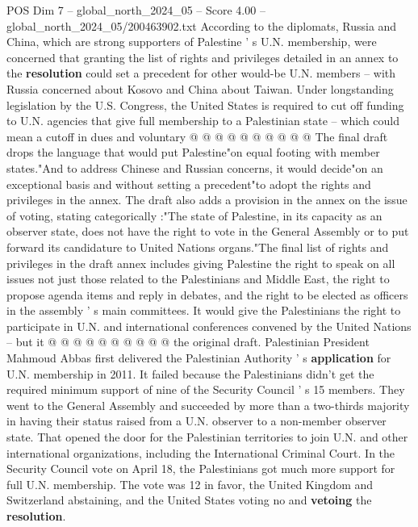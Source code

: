 \begin{textsample}{POS Dim 7 – global\_north\_2024\_05 – Score 4.00 – global\_north\_2024\_05/200463902.txt}
According to the diplomats, Russia and China, which are strong supporters of Palestine ' s U.N. membership, were concerned that granting the list of rights and privileges detailed in an annex to the \textbf{resolution} could set a precedent for other would-be U.N. members -- with Russia concerned about Kosovo and China about Taiwan.
Under longstanding legislation by the U.S.
Congress, the United States is required to cut off funding to U.N. agencies that give full membership to a Palestinian state -- which could mean a cutoff in dues and voluntary @ @ @ @ @ @ @ @ @ @ The final draft drops the language that would put Palestine"on equal footing with member states."And to address Chinese and Russian concerns, it would decide"on an exceptional basis and without setting a precedent"to adopt the rights and privileges in the annex.
The draft also adds a provision in the annex on the issue of voting, stating categorically :"The state of Palestine, in its capacity as an observer state, does not have the right to vote in the General Assembly or to put forward its candidature to United Nations organs."The final list of rights and privileges in the draft annex includes giving Palestine the right to speak on all issues not just those related to the Palestinians and Middle East, the right to propose agenda items and reply in debates, and the right to be elected as officers in the assembly ' s main committees.
It would give the Palestinians the right to participate in U.N. and international conferences convened by the United Nations -- but it @ @ @ @ @ @ @ @ @ @ the original draft.
Palestinian President Mahmoud Abbas first delivered the Palestinian Authority ' s \textbf{application} for U.N. membership in 2011.
It failed because the Palestinians didn't get the required minimum support of nine of the Security Council ' s 15 members.
They went to the General Assembly and succeeded by more than a two-thirds majority in having their status raised from a U.N. observer to a non-member observer state.
That opened the door for the Palestinian territories to join U.N. and other international organizations, including the International Criminal Court.
In the Security Council vote on April 18, the Palestinians got much more support for full U.N. membership.
The vote was 12 in favor, the United Kingdom and Switzerland abstaining, and the United States voting no and \textbf{vetoing} the \textbf{resolution}.

\end{textsample}
